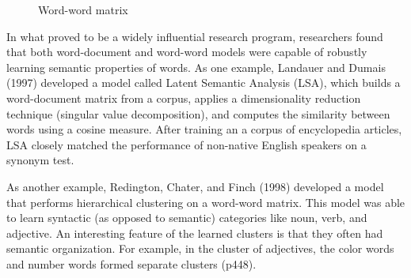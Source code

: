 \documentclass[man,floatsintext]{apa6}
\begin{document}
\begin{figure}
  \begin{center} \footnotesize{}
    \caption{Word-word matrix}
    \label{matrix-word-word}
  \end{center}
\end{figure}

In what proved to be a widely influential research program, researchers found that both word-document and word-word models were capable of robustly learning semantic properties of words. As one example, Landauer and Dumais (1997) developed a model called Latent Semantic Analysis (LSA), which builds a word-document matrix from a corpus, applies a dimensionality reduction technique (singular value decomposition), and computes the similarity between words using a cosine measure. After training an a corpus of encyclopedia articles, LSA closely matched the performance of non-native English speakers on a synonym test.

As another example, Redington, Chater, and Finch (1998) developed a model that performs hierarchical clustering on a word-word matrix. This model was able to learn syntactic (as opposed to semantic) categories like noun, verb, and adjective. An interesting feature of the learned clusters is that they often had semantic organization. For example, in the cluster of adjectives, the color words and number words formed separate clusters (p448).%
\end{document}
